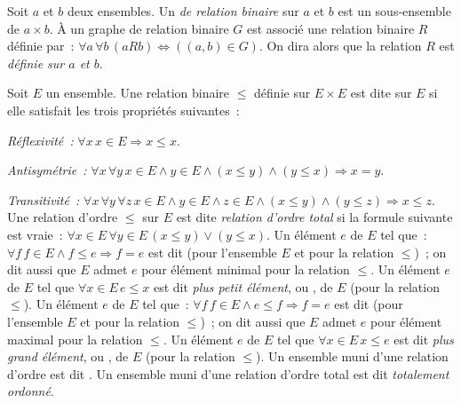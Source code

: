 \done

\stopsubsection

\startsubsection[title=Graphe de relation binaire]

Soit $a$ et $b$ deux ensembles. 
Un \emph{ de relation binaire} sur $a$ et $b$ est un sous-ensemble de $a \times b$. 
À un graphe de relation binaire $G$ est associé une relation binaire $R$ définie par : $\forall a \, \forall b \, (a R b) \Leftrightarrow ((a,b) \in G)$. 
On dira alors que la relation $R$ est \emph{définie sur $a$ et $b$}.

\stopsubsection

\startsubsection[title=Relation d'ordre]

Soit $E$ un ensemble. 
Une relation binaire $\leq$ définie sur $E \times E$ est dite \emph{} sur $E$ si elle satisfait les trois propriétés suivantes : 
\startitemize[nowhite]
    \item \emph{Réflexivité :} $\forall x \, x \in E \Rightarrow x \leq x$.
    \item \emph{Antisymétrie :} $\forall x \, \forall y \, x \in E \wedge y \in E \wedge (x \leq y) \wedge (y \leq x) \Rightarrow x = y$.
    \item \emph{Transitivité :} $\forall x \, \forall y \, \forall z \, x \in E \wedge y \in E \wedge z \in E \wedge (x \leq y) \mathrel{\wedge} (y \leq z) \Rightarrow x \leq z$.
\stopitemize 
Une relation d'ordre $\leq$ sur $E$ est dite \emph{relation d'ordre total} si la formule suivante est vraie : $\forall x \in E \, \forall y \in E \, (x \leq y) \vee (y \leq x)$.
Un élément $e$ de $E$ tel que : $\forall f \, f \in E \wedge f \leq e \Rightarrow f = e$ est dit \emph{} (pour l'ensemble $E$ et pour la relation $\leq$) ; on dit aussi que $E$ admet $e$ pour élément minimal pour la relation $\leq$. 
Un élément $e$ de $E$ tel que $\forall x \in E \, e \leq x$ est dit \emph{plus petit élément}, ou \emph{}, de $E$ (pour la relation $\leq$).
Un élément $e$ de $E$ tel que : $\forall f \, f \in E \wedge e \leq f \Rightarrow f = e$ est dit \emph{} (pour l'ensemble $E$ et pour la relation $\leq$) ; on dit aussi que $E$ admet $e$ pour élément maximal pour la relation $\leq$. 
Un élément $e$ de $E$ tel que $\forall x \in E \, x \leq e$ est dit \emph{plus grand élément}, ou \emph{}, de $E$ (pour la relation $\leq$).
Un ensemble muni d'une relation d'ordre est dit \emph{}.
Un ensemble muni d'une relation d'ordre total est dit \emph{totalement ordonné}.

